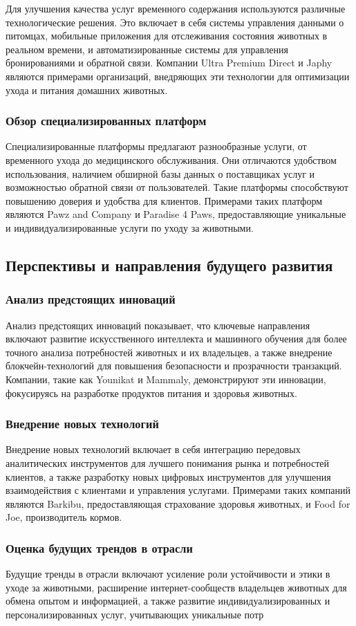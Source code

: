 Для улучшения качества услуг временного содержания используются различные технологические решения. Это включает в себя системы управления данными о питомцах, мобильные приложения для отслеживания состояния животных в реальном времени, и автоматизированные системы для управления бронированиями и обратной связи. Компании Ultra Premium Direct и Japhy являются примерами организаций, внедряющих эти технологии для оптимизации ухода и питания домашних животных.
\subsubsection{Обзор специализированных платформ}

Специализированные платформы предлагают разнообразные услуги, от временного ухода до медицинского обслуживания. Они отличаются удобством использования, наличием обширной базы данных о поставщиках услуг и возможностью обратной связи от пользователей. Такие платформы способствуют повышению доверия и удобства для клиентов. Примерами таких платформ являются Pawz and Company и Paradise 4 Paws, предоставляющие уникальные и индивидуализированные услуги по уходу за животными.
\subsection{Перспективы и направления будущего развития}
\subsubsection{Анализ предстоящих инноваций}

Анализ предстоящих инноваций показывает, что ключевые направления включают развитие искусственного интеллекта и машинного обучения для более точного анализа потребностей животных и их владельцев, а также внедрение блокчейн-технологий для повышения безопасности и прозрачности транзакций. Компании, такие как Younikat и Mammaly, демонстрируют эти инновации, фокусируясь на разработке продуктов питания и здоровья животных.
\subsubsection{Внедрение новых технологий}

Внедрение новых технологий включает в себя интеграцию передовых аналитических инструментов для лучшего понимания рынка и потребностей клиентов, а также разработку новых цифровых инструментов для улучшения взаимодействия с клиентами и управления услугами. Примерами таких компаний являются Barkibu, предоставляющая страхование здоровья животных, и Food for Joe, производитель кормов.
\subsubsection{Оценка будущих трендов в отрасли}

Будущие тренды в отрасли включают усиление роли устойчивости и этики в уходе за животными, расширение интернет-сообществ владельцев животных для обмена опытом и информацией, а также развитие индивидуализированных и персонализированных услуг, учитывающих уникальные потр